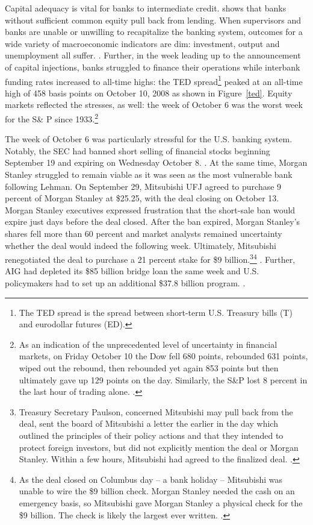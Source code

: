 \documentclass[12pt]{article}
\begin{document}
Capital adequacy is vital for banks to intermediate credit. \citet{Peek} shows that banks without sufficient common equity pull back from lending. When supervisors and banks are unable or unwilling to recapitalize the banking system, outcomes for a wide variety of macroeconomic indicators are dim: investment, output and unemployment all suffer. \citep{Hoshi}. Further, in the week leading up to the announcement of capital injections, banks struggled to finance their operations while interbank funding rates increased to all-time highs: the TED spread\footnote{The TED spread is the spread between short-term U.S. Treasury bills (T) and eurodollar futures (ED).} peaked at an all-time high of 458 basis points on October 10, 2008 as shown in Figure~\ref{ted}. Equity markets reflected the stresses, as well: the week of October 6 was the worst week for the S\& P since 1933.\footnote{As an indication of the unprecedented level of uncertainty in financial markets, on Friday October 10 the Dow fell 680 points, rebounded 631 points, wiped out the rebound, then rebounded yet again 853 points but then ultimately gave up 129 points on the day. Similarly, the S\&P lost 8 percent in the last hour of trading alone. \citep{paulsonbook}.} 

The week of October 6 was particularly stressful for the U.S. banking system. Notably, the SEC had banned short selling of financial stocks beginning September 19 and expiring on Wednesday October 8. \citep{shortban}. At the same time, Morgan Stanley struggled to remain viable as it was seen as the most vulnerable bank following Lehman. On September 29, Mitsubishi UFJ agreed to purchase 9 percent of Morgan Stanley at \$25.25, with the deal closing on October 13. Morgan Stanley executives expressed frustration that the short-sale ban would expire just days before the deal closed. After the ban expired, Morgan Stanley's shares fell more than 60 percent and market analysts remained uncertainty whether the deal would indeed the following week. Ultimately, Mitsubishi renegotiated the deal to purchase a 21 percent stake for \$9 billion.\footnote{Treasury Secretary Paulson, concerned Mitsubishi may pull back from the deal, sent the board of Mitsubishi a letter the earlier in the day which outlined the principles of their policy actions and that they intended to protect foreign investors, but did not explicitly mention the deal or Morgan Stanley. Within a few hours, Mitsubishi had agreed to the finalized deal. \citep{paulsonbook}.}\footnote{As the deal closed on Columbus day -- a bank holiday -- Mitsubishi was unable to wire the \$9 billion check. Morgan Stanley needed the cash on an emergency basis, so Mitsubishi gave Morgan Stanley a physical check for the \$9 billion. The check is likely the largest ever written. \citep{Sorkin}.} \citep{MUFGMS}. Further, AIG had depleted its \$85 billion bridge loan the same week and U.S. policymakers had to set up an additional \$37.8 billion program. \citep{Geithner}. 
\end{document}
